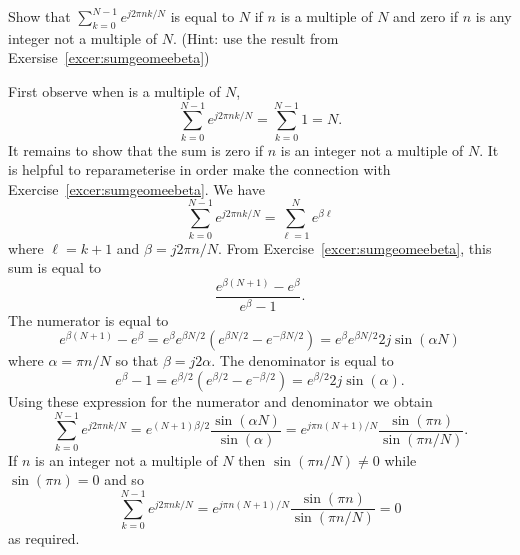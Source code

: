 \begin{excersizelist}
\item \label{exer:sumcomplexdelta} Show that $\sum_{k = 0}^{N-1} e^{j 2\pi n k / N}$ is equal to $N$ if $n$ is a multiple of $N$ and zero if $n$ is any integer not a multiple of $N$. (Hint: use the result from Exersise~\ref{excer:sumgeomeebeta})
\begin{solution}
First observe when is a multiple of $N$,
\[
\sum_{k = 0}^{N-1} e^{j 2\pi n k / N} = \sum_{k = 0}^{N-1} 1 = N.
\]
It remains to show that the sum is zero if $n$ is an integer not a multiple of $N$.
It is helpful to reparameterise in order make the connection with Exercise~\ref{excer:sumgeomeebeta}.  We have
\[
\sum_{k = 0}^{N-1} e^{j 2\pi n k / N} = \sum_{\ell = 1}^N e^{\beta \ell} 
\]
where $\ell = k + 1$ and $\beta = j 2\pi n / N$.  From Exercise~\ref{excer:sumgeomeebeta}, this sum is equal to
\[
 \frac{e^{\beta (N+1)} - e^\beta}{e^\beta - 1}.
\]
The numerator is equal to
 \[
 e^{\beta (N+1)} - e^\beta = e^{\beta}e^{\beta N/2}(e^{\beta N/2} - e^{-\beta N/2}) = e^{\beta}e^{\beta N/2} 2 j \sin(\alpha N)
 \]
where $\alpha = \pi n/N$ so that $\beta = j 2 \alpha$.  The denominator is equal to
\[
e^\beta - 1 = e^{\beta/2}(e^{\beta/2} - e^{-\beta/2}) = e^{\beta/2} 2 j \sin(\alpha) .
\]
Using these expression for the numerator and denominator we obtain
\[
\sum_{k = 0}^{N-1} e^{j 2\pi n k / N} = e^{(N+1) \beta /2} \frac{\sin(\alpha N)}{ \sin(\alpha) } = e^{j \pi n (N+1)/N} \frac{\sin(\pi n)}{ \sin(\pi n / N) }.
\]
If $n$ is an integer not a multiple of $N$ then $\sin( \pi n / N) \neq 0$ while $\sin(\pi n) = 0$ and so
\[
\sum_{k = 0}^{N-1} e^{j 2\pi n k / N} = e^{j \pi n (N+1)/N} \frac{\sin(\pi n)}{ \sin(\pi n / N) } = 0
\]
as required.
\end{solution}




\end{excersizelist}
